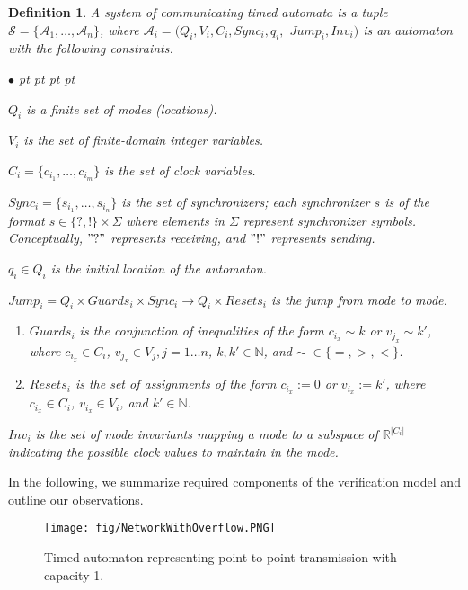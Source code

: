 \documentclass[10pt, a4paper, onecolumn, conference, compsocconf]{IEEEtran}
\newenvironment{list1}{\begin{list}{$\bullet$}
{\topsep 0 pt \parsep 0 pt \partopsep 0 pt \itemsep 0
pt}}{\end{list}}
\newtheorem{defi}{Definition}
\begin{document}
\begin{defi} A system of communicating timed automata is a tuple
$\mathcal{S}=\{\mathcal{A}_1, \ldots , \mathcal{A}_n\}$, where
$\mathcal{A}_i = (Q_i, V_i, C_i, Sync_i, q_i,$
 $Jump_i, Inv_i)$ is
an automaton with the following constraints.
\begin{list1}
\item $Q_i$ is a finite set of \emph{modes} (\emph{locations}).

\item $V_i$ is the set of finite-domain integer variables.

\item $C_i = \{c_{i_1},\ldots, c_{i_m}\}$ is the set of
\emph{clock variables}.

\item $Sync_i = \{s_{i_1}, \ldots, s_{i_n}\}$ is the set of
\emph{synchronizers}; each synchronizer $s$ is of the format $s
\in \{?,!\} \times \Sigma $ where elements in $\Sigma$ represent
synchronizer symbols. Conceptually, $"?"$ represents receiving,
and $"!"$ represents sending.

\item $q_i \in Q_i$ is the \emph{initial location} of the
automaton.

\item $Jump_i=Q_i\times Guards_i \times Sync_i \rightarrow Q_i \times Resets_i$
is the jump from mode to mode.
\begin{enumerate}
\item $Guards_i$ is the conjunction of inequalities
    of the form $c_{i_x} \sim k$ or $v_{j_x} \sim k'$, where $c_{i_x} \in
    C_i$, $v_{j_x} \in V_j, j=1\ldots n$, $k,k' \in \mathbb{N}$, and $\sim\; \in\{=,>,<\}$.
\item $Resets_i$ is the set of assignments of the form $c_{i_x} := 0$ or $v_{i_x} := k'$, where $c_{i_x} \in
    C_i$, $v_{i_x} \in V_i$, and $k' \in \mathbb{N}$.
\end{enumerate}

\item $Inv_i$ is the set of mode invariants mapping a mode to a
subspace of $\mathbb{R}^{|C_i|}$ indicating the possible clock
values to maintain in the mode.
\end{list1}
\end{defi}

In the following, we summarize required components of the verification model and outline our observations.
\begin{figure}
 \centering
 \texttt{[image: fig/NetworkWithOverflow.PNG]}
 \caption{Timed automaton representing point-to-point transmission with capacity 1.}
 \label{fig:TA.p2p}
\end{figure}
\end{document}
